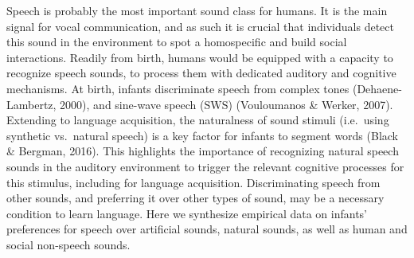 \documentclass[man]{apa6}
\begin{document}
Speech is probably the most important sound class for humans. It is the
main signal for vocal communication, and as such it is crucial that
individuals detect this sound in the environment to spot a homospecific
and build social interactions. Readily from birth, humans would be
equipped with a capacity to recognize speech sounds, to process them
with dedicated auditory and cognitive mechanisms. At birth, infants
discriminate speech from complex tones (Dehaene-Lambertz, 2000), and
sine-wave speech (SWS) (Vouloumanos \& Werker, 2007). Extending to
language acquisition, the naturalness of sound stimuli (i.e.~using
synthetic vs.~natural speech) is a key factor for infants to segment
words (Black \& Bergman, 2016). This highlights the importance of
recognizing natural speech sounds in the auditory environment to trigger
the relevant cognitive processes for this stimulus, including for
language acquisition. Discriminating speech from other sounds, and
preferring it over other types of sound, may be a necessary condition to
learn language. Here we synthesize empirical data on infants'
preferences for speech over artificial sounds, natural sounds, as well
as human and social non-speech sounds.
\end{document}
